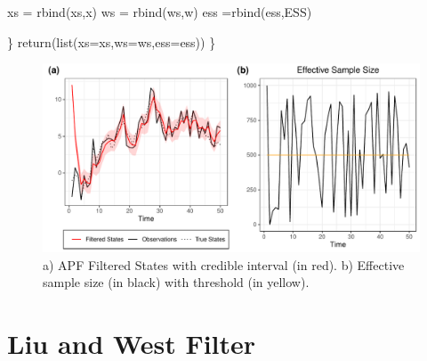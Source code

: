 \documentclass[
]{book}
\newenvironment{Shaded}{\begin{snugshade}}{\end{snugshade}}
\newcommand{\AttributeTok}[1]{\textcolor[rgb]{0.77,0.63,0.00}{#1}}
\newcommand{\FunctionTok}[1]{\textcolor[rgb]{0.00,0.00,0.00}{#1}}
\newcommand{\NormalTok}[1]{#1}
\newcommand{\OtherTok}[1]{\textcolor[rgb]{0.56,0.35,0.01}{#1}}
\theoremstyle{break}
\theoremstyle{nonumberplain}
\begin{document}
\begin{Shaded}
\begin{Highlighting}[]
    
\NormalTok{    xs }\OtherTok{=} \FunctionTok{rbind}\NormalTok{(xs,x)}
\NormalTok{    ws }\OtherTok{=} \FunctionTok{rbind}\NormalTok{(ws,w)}
\NormalTok{    ess }\OtherTok{=}\FunctionTok{rbind}\NormalTok{(ess,ESS)}
    
\NormalTok{  \}}
  \FunctionTok{return}\NormalTok{(}\FunctionTok{list}\NormalTok{(}\AttributeTok{xs=}\NormalTok{xs,}\AttributeTok{ws=}\NormalTok{ws,}\AttributeTok{ess=}\NormalTok{ess))}
\NormalTok{\}}
\end{Highlighting}
\end{Shaded}

\begin{figure}[H]

{\centering \includegraphics{final-draft_files/figure-latex/unnamed-chunk-32-1} 

}

\caption{a) APF Filtered States with credible interval (in red). b) Effective sample size (in black) with threshold (in yellow).}\label{fig:unnamed-chunk-32}
\end{figure}

\section{Liu and West Filter}\label{pf_lui_west}
\end{document}
